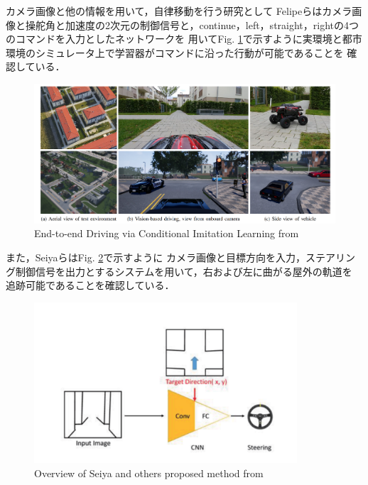 \newpage
カメラ画像と他の情報を用いて，自律移動を行う研究として
Felipeら\cite{razikon}はカメラ画像と操舵角と加速度の2次元の制御信号と，continue，left，straight，rightの4つのコマンドを入力としたネットワークを
用いてFig. \ref{fig::Conditional_Imitation_Learning}で示すように実環境と都市環境のシミュレータ上で学習器がコマンドに沿った行動が可能であることを
確認している．
\begin{figure}[H]
    \centering
    \includegraphics[width = 12cm]{./figs/End-to-end_Driving_via_Conditional_Imitation_Learning.pdf}
    \caption{End-to-end  Driving  via  Conditional  Imitation  Learning from \cite{razikon}}
    \label{fig::Conditional_Imitation_Learning}
\end{figure}

また，Seiyaら\cite{nagoya}はFig. \ref{fig::nagoyaabst}で示すように
カメラ画像と目標方向を入力，ステアリング制御信号を出力とするシステムを用いて，右および左に曲がる屋外の軌道を
追跡可能であることを確認している．

\begin{figure}[H]
    \centering
    \includegraphics[width = 9.8cm]{./figs/End-to-End_Navigation_with_Branch_Turning_Support_using_Convolutional_Neural_Network_abst.pdf}
    \caption{Overview of Seiya and others proposed method from \cite{nagoya}}
    \label{fig::nagoyaabst}
\end{figure}


